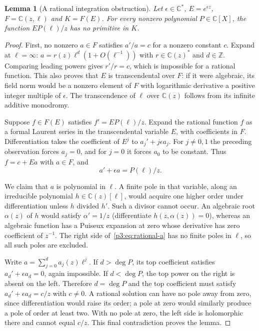 \documentclass[11pt,a4paper]{article}
\newtheorem{lemma}[theorem]{Lemma}
\theoremstyle{definition}
\theoremstyle{remark}
\numberwithin{equation}{section}
\begin{document}
\begin{lemma}[A rational integration obstruction]\label{p3:lem:primitive-obstruction}
Let $\epsilon\in\mathbb C^*$, $E=e^{\epsilon z}$,
$F=\mathbb C(z,\ell)$ and $K=F(E)$.  For every nonzero polynomial
$P\in\mathbb C[X]$, the function $EP(\ell)/z$ has no primitive in $K$.
\end{lemma}
\begin{proof}
First, no nonzero $a\in F$ satisfies $a'/a=c$ for a nonzero constant
$c$.  Expand at $\ell=\infty$:
$a=r(z)\ell^d(1+O(\ell^{-1}))$ with $r\in\mathbb C(z)^*$ and
$d\in\mathbb Z$.  Comparing leading powers gives $r'/r=c$, which is
impossible for a rational function.  This also proves that $E$ is
transcendental over $F$: if it were algebraic, its field norm would be
a nonzero element of $F$ with logarithmic derivative a positive integer
multiple of $\epsilon$.  The transcendence of $\ell$ over $\mathbb C(z)$
follows from its infinite additive monodromy.

Suppose $f\in F(E)$ satisfies $f'=EP(\ell)/z$.  Expand the rational
function $f$ as a formal Laurent series in the transcendental variable
$E$, with coefficients in $F$.  Differentiation takes the coefficient
of $E^j$ to $a_j'+j\epsilon a_j$.  For $j\ne0,1$ the preceding
observation forces $a_j=0$, and for $j=0$ it forces $a_0$ to be constant.
Thus $f=c+Ea$ with $a\in F$, and
\begin{equation}\label{p3:eq:rational-a}
 a'+\epsilon a=P(\ell)/z.
\end{equation}

We claim that $a$ is polynomial in $\ell$.  A finite pole in that
variable, along an irreducible polynomial $h\in\mathbb C(z)[\ell]$,
would acquire one higher order under differentiation unless $h$ divided
$h'$.  Such a divisor cannot occur.  An algebraic root $\alpha(z)$ of
$h$ would satisfy $\alpha'=1/z$ (differentiate
$h(z,\alpha(z))=0$), whereas an algebraic function has a Puiseux
expansion at zero whose derivative has zero coefficient of $z^{-1}$.
The right side of~\eqref{p3:eq:rational-a} has no finite poles in $\ell$,
so all such poles are excluded.

Write $a=\sum_{j=0}^d a_j(z)\ell^j$.  If $d>\deg P$, its top
coefficient satisfies $a_d'+\epsilon a_d=0$, again impossible.
If $d<\deg P$, the top power on the right is absent on the left.
Therefore $d=\deg P$ and the top coefficient must satisfy
$a_d'+\epsilon a_d=c/z$ with $c\ne0$.  A rational solution can have
no pole away from zero, since differentiation would raise its order;
a pole at zero would similarly produce a pole of order at least two.
With no pole at zero, the left side is holomorphic there and cannot
equal $c/z$.  This final contradiction proves the lemma.
\end{proof}
\end{document}
